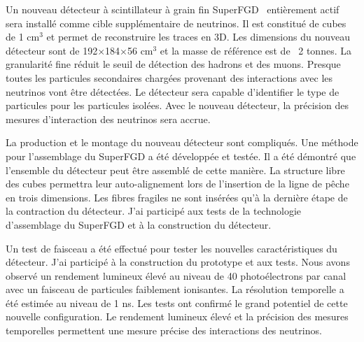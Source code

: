 \documentclass[../main.tex]{subfiles}
\begin{document}
Un nouveau détecteur à scintillateur à grain fin SuperFGD~\cite{Blondel2018} entièrement actif sera installé comme cible supplémentaire de neutrinos. Il est constitué de cubes de 1 cm${}^3$ et permet de reconstruire les traces en 3D. Les dimensions du nouveau détecteur sont de 192$\times$184$\times$56 cm${}^3$ et la masse de référence est de ~2 tonnes. La granularité fine réduit le seuil de détection des hadrons et des muons. Presque toutes les particules secondaires chargées provenant des interactions avec les neutrinos vont être détectées. Le détecteur sera capable d'identifier le type de particules pour les particules isolées. Avec le nouveau détecteur, la précision des mesures d'interaction des neutrinos sera accrue.


La production et le montage du nouveau détecteur sont compliqués. Une méthode pour l'assemblage du SuperFGD a été développée et testée. Il a été démontré que l'ensemble du détecteur peut être assemblé de cette manière. La structure libre des cubes permettra leur auto-alignement lors de l'insertion de la ligne de pêche en trois dimensions. Les fibres fragiles ne sont insérées qu'à la dernière étape de la contraction du détecteur. J'ai participé aux tests de la technologie d'assemblage du SuperFGD et à la construction du détecteur.


Un test de faisceau a été effectué pour tester les nouvelles caractéristiques du détecteur. J'ai participé à la construction du prototype et aux tests. Nous avons observé un rendement lumineux élevé au niveau de 40 photoélectrons par canal avec un faisceau de particules faiblement ionisantes. La résolution temporelle a été estimée au niveau de 1 ns. Les tests ont confirmé le grand potentiel de cette nouvelle configuration. Le rendement lumineux élevé et la précision des mesures temporelles permettent une mesure précise des interactions des neutrinos.
\end{document}
